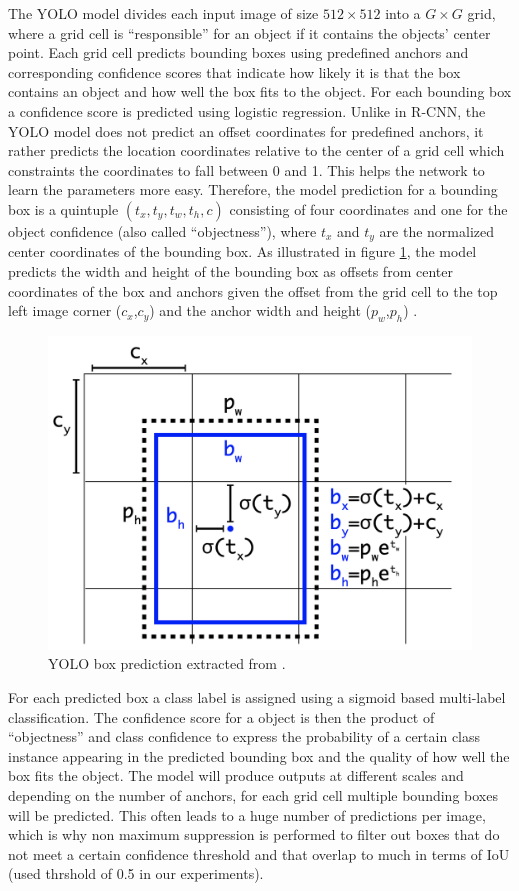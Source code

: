 The \ac{YOLO} model divides each input image of size $512\times512$ into a $G\times G$ grid, where a grid cell is \enquote{responsible} for an object if it contains the objects' center point. Each grid cell predicts bounding boxes using predefined anchors and corresponding confidence scores that indicate how likely it is that the box contains an object and how well the box fits to the object. For each bounding box a confidence score is predicted using logistic regression. Unlike in \ac{R-CNN}, the \ac{YOLO} model does not predict an offset coordinates for predefined anchors, it rather predicts the location coordinates relative to the center of a grid cell which constraints the coordinates to fall between 0 and 1. This helps the network to learn the parameters more easy. Therefore, the model prediction for a bounding box is a quintuple $(t_x,t_y,t_w,t_h,c)$ consisting of four coordinates and one for the object confidence (also called \enquote{objectness}), where $t_x$ and $t_y$ are the normalized center coordinates of the bounding box. As illustrated in figure \ref{fig:yolo_box}, the model predicts the width and height of the bounding box as offsets from center coordinates of the box and anchors given the offset from the grid cell to the top left image corner ($c_x$,$c_y$) and the anchor width and height ($p_w$,$p_h$) \autocite{yolov2} \autocite{yolov3}.
\begin{figure}[h!]
	\centering
	\includegraphics[width=.45\linewidth]{img/boxpred.png}
	\caption{\ac{YOLO} box prediction extracted from \autocite{yolov3}.}
	\label{fig:yolo_box}
\end{figure}
For each predicted box a class label is assigned using a sigmoid based multi-label classification. The confidence score for a object is then the product of \enquote{objectness} and class confidence to express the probability of a certain class instance appearing in the predicted bounding box and the quality of how well the box fits the object.
The model will produce outputs at different scales and depending on the number of anchors, for each grid cell multiple bounding boxes will be predicted. This often leads to a huge number of predictions per image, which is why non maximum suppression is performed  to filter out boxes that do not meet a certain confidence threshold and that overlap to much in terms of \ac{IoU} (used thrshold of 0.5 in our experiments).


